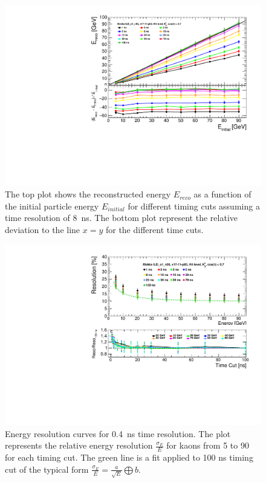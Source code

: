 \begin{figure}[htbp!]
  \centering
  \includegraphics[width=0.7\linewidth]{../Thesis_Plots/ILD/Smearing_8ns/Plots/Linearity_TimeCuts_Smearing3}
  \caption{The top plot shows the reconstructed energy $E_{reco}$ as a function of the initial particle energy $E_{initial}$ for different timing cuts assuming a time resolution of \SI{8}{\nano\second}. The bottom plot represent the relative deviation to the line $x=y$ for the different time cuts.}  \label{fig:Lin8ns}
\end{figure}

\begin{figure}[htbp!]
  \centering
  \includegraphics[width=0.7\linewidth]{../Thesis_Plots/ILD/Smearing_0.4ns/Plots/ShowerResoAbsolute_TimeCuts_Smearing1}
  \caption{Energy resolution curves for \SI{0.4}{\nano\second} time resolution. The plot represents the relative energy resolution $\frac{\sigma_{E}}{E}$ for kaons from 5 to 90 \GeV for each timing cut. The green line is a fit applied to 100 ns timing cut of the typical form $\frac{\sigma_{E}}{E} = \frac{a}{\sqrt{E}} \bigoplus b$.} \label{fig:Reso0.4ns}
\end{figure}

